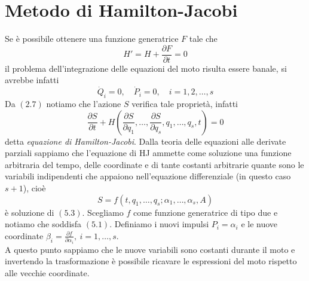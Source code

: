 \documentclass{article}
\begin{document}
\section{Metodo di Hamilton-Jacobi}
Se è possibile ottenere una funzione generatrice $F$ tale che
\begin{equation}
    H' = H + \frac{\partial F}{\partial t} = 0 \tag{5.1}
\end{equation}
il problema dell'integrazione delle equazioni del moto risulta essere banale, si avrebbe infatti
\begin{equation}
    \dot{Q}_i = 0, \quad \dot{P}_i = 0, \quad i = 1,2, \dots, s \tag{5.2}
\end{equation}
Da $(2.7)$ notiamo che l'azione $S$ verifica tale proprietà, infatti
\begin{equation}
    \frac{\partial S}{\partial t} + H\left(\frac{\partial S}{\partial q_1}, \dots, \frac{\partial S}{\partial q_s}, q_1, \dots, q_s, t\right) = 0 \tag{5.3}
\end{equation}
detta \textit{equazione di Hamilton-Jacobi}. Dalla teoria delle equazioni alle derivate parziali sappiamo che l'equazione di HJ ammette come soluzione una funzione arbitraria del tempo, delle coordinate e di tante costanti arbitrarie quante sono le variabili indipendenti che appaiono nell'equazione differenziale (in questo caso $s + 1$), cioè
\begin{equation}
    S = f(t, q_1, \dots, q_s; \alpha_1, \dots, \alpha_s, A) \tag{5.4} 
\end{equation}
è soluzione di $(5.3)$. Scegliamo $f$ come funzione generatrice di tipo due e notiamo che soddisfa $(5.1)$. Definiamo i nuovi impulsi $P_i = \alpha_i$ e le nuove coordinate $\beta_i = \frac{\partial f}{\partial \alpha_i}, \ i = 1, \dots, s$. \\
A questo punto sappiamo che le nuove variabili sono costanti durante il moto e invertendo la trasformazione è possibile ricavare le espressioni del moto rispetto alle vecchie coordinate.

\newpage
\end{document}
